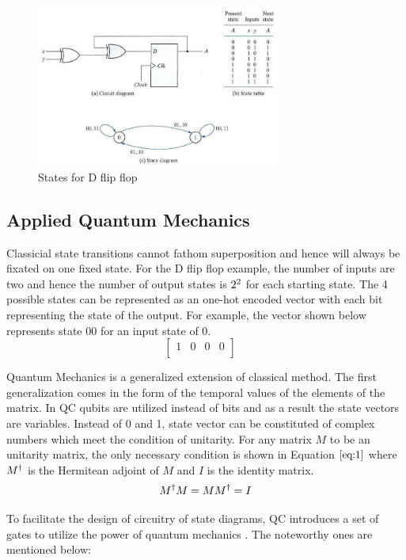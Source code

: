 \documentclass[conference]{IEEEtran}
\begin{document}
\begin{figure}[!b]
\centering\includegraphics[width=8cm]{ss.jpg}
\caption{States for D flip flop}
\label{p2}
\end{figure}

\subsection{Applied Quantum Mechanics}
Classicial state transitions cannot fathom superposition and hence will always be fixated on one fixed state. For the D flip flop example, the number of inputs are two and hence the number of output states is $2\textsuperscript{2}$ for each starting state. The 4 possible states can be represented as an one-hot encoded vector with each bit representing the state of the output. For example, the vector shown below represents state 00 for an input state of 0.
$$
\begin{bmatrix} 
1&0&0&0\\
\end{bmatrix}
\quad
$$

Quantum Mechanics is a generalized extension of classical method. The first generalization comes in the form of the temporal values of the elements of the matrix. In QC qubits are utilized instead of bits and as a result the state vectors are variables. Instead of 0 and 1, state vector can be constituted of complex numbers which meet the condition of unitarity. For any matrix $\textit{M}$ to be an unitarity matrix, the only necessary condition is shown in Equation $\ref{eq:1}$ where $M\textsuperscript{$\dagger$}$ is the Hermitean adjoint of $\textit{M}$ and $\textit{I}$ is the identity matrix. 
{\scriptsize
\begin{equation}
\label{eq:1}
M\textsuperscript{$\dagger$}M = MM\textsuperscript{$\dagger$} = I
\end{equation}
}

To facilitate the design of circuitry of state diagrams, QC introduces a set of gates to utilize the power of quantum mechanics \cite{qg}. The noteworthy ones are mentioned below:
\end{document}
